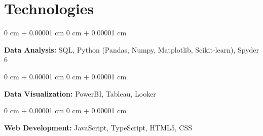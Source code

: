 \documentclass[10pt, letterpaper]{article}
\newenvironment{onecolentry}{
    \begin{adjustwidth}{
        0 cm + 0.00001 cm
    }{
        0 cm + 0.00001 cm
    }
}{
    \end{adjustwidth}
} %
\begin{document}
        


    
    \section{Technologies}



        
        \begin{onecolentry}
            \textbf{Data Analysis:} SQL, Python (Pandas, Numpy, Matplotlib, Scikit-learn), Spyder 6
        \end{onecolentry}

        \vspace{0.2 cm}
        \begin{onecolentry}
            \textbf{Data Visualization:} PowerBI, Tableau, Looker
        \end{onecolentry}

        \vspace{0.2 cm}
        \begin{onecolentry}
            \textbf{Web Development:} JavaScript, TypeScript, HTML5, CSS
        \end{onecolentry}


    
\end{document}
